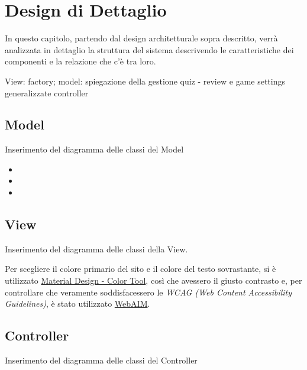\chapter{Design di Dettaglio}\label{chap:design}
In questo capitolo, partendo dal design architetturale sopra descritto, verrà analizzata in dettaglio la struttura del sistema descrivendo le caratteristiche dei componenti e la relazione che c'è tra loro.

View: factory;
model: spiegazione della gestione quiz - review e game settings generalizzate
controller

    \section{Model}
    Inserimento del diagramma delle classi del Model
        \begin{itemize}
            \item 
            \item 
            \item 
        \end{itemize}
    \section{View}
    Inserimento del diagramma delle classi della View.
    
    Per scegliere il colore primario del sito e il colore del testo sovrastante, si è utilizzato \href{https://m2.material.io/resources/color/#!/?view.left=1&view.right=1&primary.color=8a171a&secondary.color=DEDEDE}{Material Design - Color Tool}, così che avessero il giusto contrasto e, per controllare che veramente soddisfacessero le \textit{WCAG (Web Content Accessibility Guidelines)}, è stato utilizzato \href{https://webaim.org/resources/contrastchecker/?fcolor=DEDEDE&bcolor=8A171A}{WebAIM}.
    
    \section{Controller}
    Inserimento del diagramma delle classi del Controller